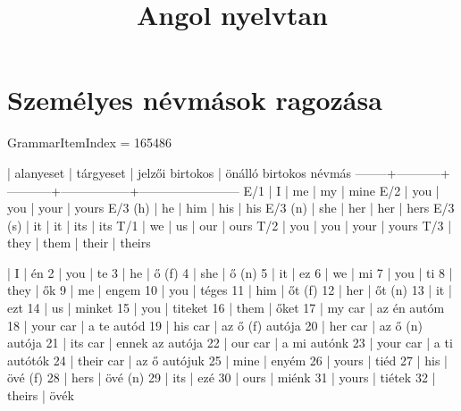 \documentclass{article}
\title{Angol nyelvtan}
\newenvironment{desc}{\verbatim}{\endverbatim}
\newenvironment{exmp}{\verbatim}{\endverbatim}
\begin{document}
\maketitle

\tableofcontents

\section{Személyes névmások ragozása}

GrammarItemIndex = 165486

\begin{desc}
        | alanyeset | tárgyeset | jelzői birtokos | önálló birtokos névmás
--------+-----------+-----------+-----------------+------------------------
E/1     | I         | me        | my              | mine
E/2     | you       | you       | your            | yours
E/3 (h) | he        | him       | his             | his
E/3 (n) | she       | her       | her             | hers
E/3 (s) | it        | it        | its             | its
T/1     | we        | us        | our             | ours
T/2     | you       | you       | your            | yours
T/3     | they      | them      | their           | theirs
\end{desc}

\begin{exmp}
1 | I | én
2 | you | te
3 | he | ő (f)
4 | she | ő (n)
5 | it | ez
6 | we | mi
7 | you | ti
8 | they | ők
9 | me | engem
10 | you | téges
11 | him | őt (f)
12 | her | őt (n)
13 | it | ezt
14 | us | minket
15 | you | titeket
16 | them | őket
17 | my car | az én autóm
18 | your car | a te autód
19 | his car | az ő (f) autója
20 | her car | az ő (n) autója
21 | its car | ennek az autója
22 | our car | a mi autónk
23 | your car | a ti autótók
24 | their car | az ő autójuk
25 | mine | enyém
26 | yours | tiéd
27 | his | övé (f)
28 | hers | övé (n)
29 | its | ezé
30 | ours | miénk
31 | yours | tiétek
32 | theirs | övék
\end{exmp}
\end{document}
